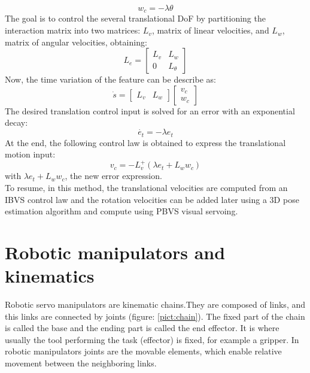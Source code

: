 \begin{equation}
    w_c = - \lambda \theta
\end{equation}
The goal is to control the several translational DoF by partitioning the interaction matrix into two matrices: $L_v$, matrix of linear velocities, and $L_w$, matrix of angular velocities, obtaining:
\begin{equation}
    L_e
=
\begin{bmatrix}
   L_v & L_w \\
    0 & L_\theta
\end{bmatrix}
\end{equation}
Now, the time variation of the feature can be describe as:
\begin{equation}
    \Dot{s}
=
\begin{bmatrix}
   L_v & L_w 
\end{bmatrix}
\begin{bmatrix}
   v_c \\ 
   w_c
\end{bmatrix}
\end{equation}
The desired translation control input is solved for an error with an exponential decay:
\begin{equation}
    \Dot{e_t} = -\lambda e_t
\end{equation}
At the end, the following control law is obtained to express the translational motion input:
\begin{equation}
    v_c = - L_v^+(\lambda e_t + L_w w_c)
\end{equation}
 with $\lambda e_t + L_w w_c$, the new error expression. \\

To resume, in this method, the translational velocities are computed from an IBVS control law and the rotation velocities can be added later using a 3D pose estimation algorithm and compute using PBVS visual servoing. 


\section{Robotic manipulators and kinematics}
\label{Robotic_manipulator}

Robotic servo manipulators are kinematic chains.They are composed of links, and this links are connected by joints (figure: \ref{pict:chain}). The fixed part of the chain is called the base and the ending part is called the end effector. It is where usually the tool performing the task (effector) is fixed, for example a gripper. In robotic manipulators joints are the movable elements, which enable relative movement between the neighboring links. \\


